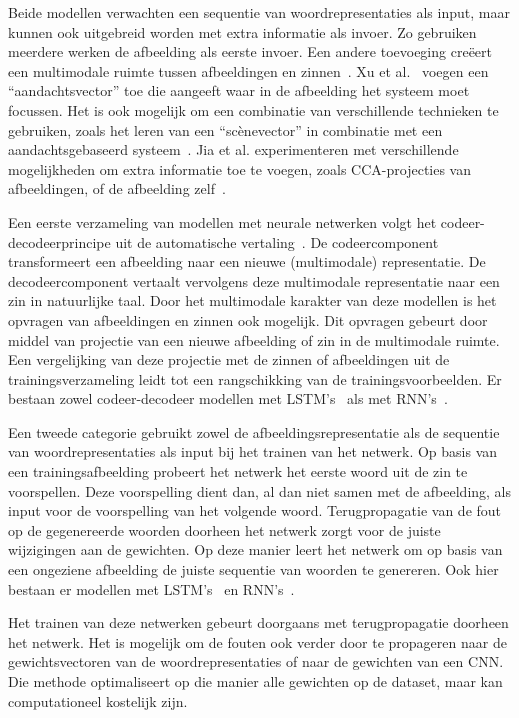Beide modellen verwachten een sequentie van woordrepresentaties als input, maar kunnen ook uitgebreid worden met extra informatie als invoer. Zo gebruiken meerdere werken de afbeelding als eerste invoer. Een andere toevoeging cre\"eert een multimodale ruimte tussen afbeeldingen en zinnen~\cite{Kiros2014,Socher2014}. Xu et al.~\cite{Xu2015} voegen een ``aandachtsvector'' toe die aangeeft waar in de afbeelding het systeem moet focussen. Het is ook mogelijk om een combinatie van verschillende technieken te gebruiken, zoals het leren van een ``sc\`enevector'' in combinatie met een aandachtsgebaseerd systeem~\cite{Jin2015}. Jia et al. experimenteren met verschillende mogelijkheden om extra informatie toe te voegen, zoals CCA-projecties van afbeeldingen, of de afbeelding zelf~\cite{Fernando2015}.

Een eerste verzameling van modellen met neurale netwerken volgt het codeer-decodeerprincipe uit de automatische vertaling~\cite{Kiros2014}. De codeercomponent transformeert een afbeelding naar een nieuwe (multimodale) representatie. De decodeercomponent vertaalt vervolgens deze multimodale representatie naar een zin in natuurlijke taal. Door het multimodale karakter van deze modellen is het opvragen van afbeeldingen en zinnen ook mogelijk. Dit opvragen gebeurt door middel van projectie van een nieuwe afbeelding of zin in de multimodale ruimte. Een vergelijking van deze projectie met de zinnen of afbeeldingen uit de trainingsverzameling leidt tot een rangschikking van de trainingsvoorbeelden. Er bestaan zowel codeer-decodeer modellen met LSTM's~\cite{Kiros2014} als met RNN's~\cite{Karpathy2014,Mao2014a}.

Een tweede categorie gebruikt zowel de afbeeldingsrepresentatie als de sequentie van 
woordrepresentaties als input bij het trainen van het netwerk. Op basis van een trainingsafbeelding probeert het netwerk het eerste woord uit de zin te voorspellen. Deze voorspelling dient dan, al dan niet samen met de afbeelding, als input voor de voorspelling van het volgende woord. Terugpropagatie van de fout op de gegenereerde woorden doorheen het netwerk zorgt voor de juiste wijzigingen aan de gewichten. Op deze manier leert het netwerk om op basis van een ongeziene afbeelding de juiste sequentie van woorden te genereren. Ook hier bestaan er modellen met LSTM's~\cite{Donahue2015,Google,Xu2015} en RNN's~\cite{Karpathy2015,Mao2014a}.

Het trainen van deze netwerken gebeurt doorgaans met terugpropagatie doorheen het netwerk. Het is mogelijk om de fouten ook verder door te propageren naar de gewichtsvectoren van de woordrepresentaties of naar de gewichten van een CNN. Die methode optimaliseert op die manier alle gewichten op de dataset, maar kan computationeel kostelijk zijn.

